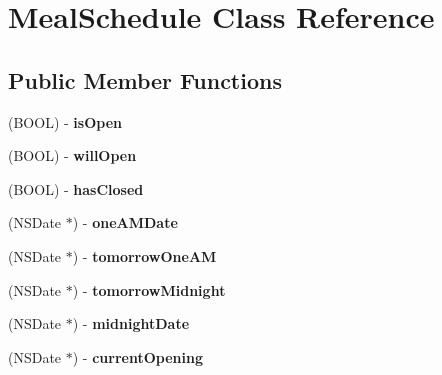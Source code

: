 \hypertarget{interface_meal_schedule}{
\section{MealSchedule Class Reference}
\label{interface_meal_schedule}
}
\subsection*{Public Member Functions}
\begin{DoxyCompactItemize}
\item 
\hypertarget{interface_meal_schedule_a9111df85dc01b4eb1114cc139bed77e7}{
(BOOL) -\/ {\bfseries isOpen}}
\label{interface_meal_schedule_a9111df85dc01b4eb1114cc139bed77e7}

\item 
\hypertarget{interface_meal_schedule_a6819cf5f5c24f9e7a9bf91d40d952737}{
(BOOL) -\/ {\bfseries willOpen}}
\label{interface_meal_schedule_a6819cf5f5c24f9e7a9bf91d40d952737}

\item 
\hypertarget{interface_meal_schedule_a7ca4d42c2842750e1e0616a0d6055c07}{
(BOOL) -\/ {\bfseries hasClosed}}
\label{interface_meal_schedule_a7ca4d42c2842750e1e0616a0d6055c07}

\item 
\hypertarget{interface_meal_schedule_a1809b343f4c85fed0ab73047dfcb4777}{
(NSDate $\ast$) -\/ {\bfseries oneAMDate}}
\label{interface_meal_schedule_a1809b343f4c85fed0ab73047dfcb4777}

\item 
\hypertarget{interface_meal_schedule_a668cf846c1e07667c4a4507cb53ee7ed}{
(NSDate $\ast$) -\/ {\bfseries tomorrowOneAM}}
\label{interface_meal_schedule_a668cf846c1e07667c4a4507cb53ee7ed}

\item 
\hypertarget{interface_meal_schedule_a2a60d9351b06f33cdec8096ccb2d3479}{
(NSDate $\ast$) -\/ {\bfseries tomorrowMidnight}}
\label{interface_meal_schedule_a2a60d9351b06f33cdec8096ccb2d3479}

\item 
\hypertarget{interface_meal_schedule_ae476853ecd16597cde21a7e61c03cc90}{
(NSDate $\ast$) -\/ {\bfseries midnightDate}}
\label{interface_meal_schedule_ae476853ecd16597cde21a7e61c03cc90}

\item 
\hypertarget{interface_meal_schedule_a3256989e3e2b7008863da90dca43d377}{
(NSDate $\ast$) -\/ {\bfseries currentOpening}}
\label{interface_meal_schedule_a3256989e3e2b7008863da90dca43d377}


\end{DoxyCompactItemize}
